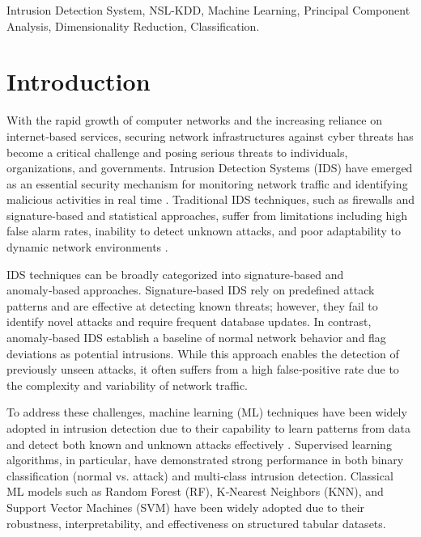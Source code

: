 \documentclass[conference]{IEEEtran}
\begin{document}
\begin{IEEEkeywords}
Intrusion Detection System, NSL-KDD, Machine Learning, Principal Component Analysis, Dimensionality Reduction, Classification.
\end{IEEEkeywords}

\section{Introduction}

With the rapid growth of computer networks and the increasing reliance on internet‑based services, securing network infrastructures against cyber threats has become a critical challenge and posing serious threats to individuals, organizations, and governments. Intrusion Detection Systems (IDS) have emerged as an essential security mechanism for monitoring network traffic and identifying malicious activities in real time \cite{b1,b2}. Traditional IDS techniques, such as firewalls and signature-based and statistical approaches, suffer from limitations including high false alarm rates, inability to detect unknown attacks, and poor adaptability to dynamic network environments \cite{b3}. 

IDS techniques can be broadly categorized into signature‑based and anomaly‑based approaches. Signature‑based IDS rely on predefined attack patterns and are effective at detecting known threats; however, they fail to identify novel attacks and require frequent database updates. In contrast, anomaly‑based IDS establish a baseline of normal network behavior and flag deviations as potential intrusions. While this approach enables the detection of previously unseen attacks, it often suffers from a high false‑positive rate due to the complexity and variability of network traffic. 

To address these challenges, machine learning (ML) techniques have been widely adopted in intrusion detection due to their capability to learn patterns from data and detect both known and unknown attacks effectively \cite{b4}. Supervised learning algorithms, in particular, have demonstrated strong performance in both binary classification (normal vs. attack) and multi‑class intrusion detection. Classical ML models such as Random Forest (RF), K‑Nearest Neighbors (KNN), and Support Vector Machines (SVM) have been widely adopted due to their robustness, interpretability, and effectiveness on structured tabular datasets. 
\end{document}
